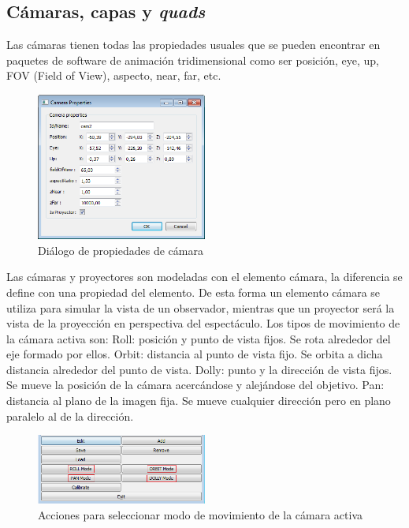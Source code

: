 \subsection{Cámaras, capas y \emph{quads}}
Las cámaras tienen todas las propiedades usuales que se pueden encontrar en paquetes de software de animación tridimensional como ser posición, eye, up, FOV (Field of View), aspecto, near, far, etc.

\begin{figure}[H]
  \centering
    \includegraphics[width=0.5\textwidth]{./Cap5_vmt/vmt_cameraProperties.png}
  \caption{Diálogo de propiedades de cámara}
  \label{fig:VMT-CameraProperties}
\end{figure}

Las cámaras y proyectores son modeladas con el elemento cámara, la diferencia se define con una propiedad del elemento. De esta forma un elemento cámara se utiliza para simular la vista de un observador, mientras que un proyector será la vista de la proyección en perspectiva del espectáculo.
Los tipos de movimiento de la cámara activa son:
Roll: posición y punto de vista fijos. Se rota alrededor del eje formado por ellos.
Orbit: distancia al punto de vista fijo. Se orbita a dicha distancia alrededor del punto de vista.
Dolly: punto y la dirección de vista fijos. Se mueve la posición de la cámara acercándose y alejándose del objetivo.
Pan: distancia al plano de la imagen fija. Se mueve cualquier dirección pero en plano paralelo al de la dirección.

\begin{figure}[H]
  \centering
    \includegraphics[width=0.5\textwidth]{./Cap5_vmt/vmt_SceneBotonera.png}
  \caption{Acciones para seleccionar modo de movimiento de la cámara activa}
  \label{fig:VMT-CameraActions}
\end{figure}

